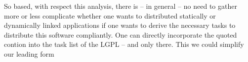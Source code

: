 So based, with respect this analysis, there is -- in general -- no need to
gather more or less complicate whether one wants to distributed statically or
dynamically linked applications if one wants to derive the necessary tasks to
distribute this software compliantly. One can directly incorporate the quoted
contion into the task list of the LGPL -- and only there. This we could simplify
our leading form


%
